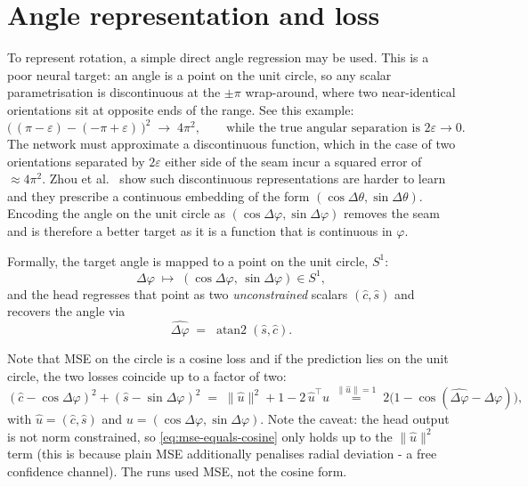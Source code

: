 \documentclass[final_report.tex]{subfiles}
\begin{document}
\section{Angle representation and loss}\label{sec:angle-representation}
To represent rotation, a simple direct angle regression may be used. This is a poor neural target: an angle is a point on the unit circle, so any scalar parametrisation is discontinuous at the $\pm\pi$ wrap-around, where two near-identical orientations sit at opposite ends of the range. See this example:
\begin{equation}\label{eq:wrap-discontinuity}
  \bigl(\,(\pi - \varepsilon) - (-\pi + \varepsilon)\,\bigr)^2 \;\longrightarrow\; 4\pi^2,
  \qquad\text{while the true angular separation is } 2\varepsilon \to 0 .
\end{equation}
The network must approximate a discontinuous function, which in the case of two orientations separated by $2\varepsilon$ either side of the seam incur a squared error of $\approx 4\pi^2$. Zhou et al.~\cite{rotcont} show such discontinuous representations are harder to learn and they prescribe a continuous embedding of the form $(\cos\Delta\theta, \sin\Delta\theta)$. Encoding the angle on the unit circle as $(\cos\Delta\varphi,\sin\Delta\varphi)$ removes the seam and is therefore a better target as it is a function that is continuous in $\varphi$. 

Formally, the target angle is mapped to a point on the unit circle, $S^1$:
\begin{equation}\label{eq:circle-encoding}
  \Delta\varphi \;\longmapsto\; (\cos\Delta\varphi,\, \sin\Delta\varphi) \in S^1,
\end{equation}
and the head regresses that point as two \emph{unconstrained} scalars $(\hat c, \hat s)$ and recovers the angle via
\begin{equation}\label{eq:atan2}
  \widehat{\Delta\varphi} \;=\; \operatorname{atan2}(\hat s, \hat c).
\end{equation}

Note that MSE on the circle is a cosine loss and if the prediction lies on the unit circle, the two losses coincide up to a factor of two:
\begin{equation}\label{eq:mse-equals-cosine}
  (\hat c - \cos\Delta\varphi)^2 + (\hat s - \sin\Delta\varphi)^2
  \;=\; \lVert \hat u \rVert^2 + 1 - 2\,\hat u^{\!\top} u
  \;\overset{\lVert\hat u\rVert = 1}{=}\; 2\bigl(1 - \cos(\widehat{\Delta\varphi} - \Delta\varphi)\bigr),
\end{equation}
with $\hat u = (\hat c, \hat s)$ and $u = (\cos\Delta\varphi, \sin\Delta\varphi)$. Note the caveat: the head output is not norm constrained, so \cref{eq:mse-equals-cosine} only holds up to the $\lVert\hat u\rVert^2$ term (this is because plain MSE additionally penalises radial deviation - a free confidence channel). The runs used MSE, not the cosine form.
\end{document}
